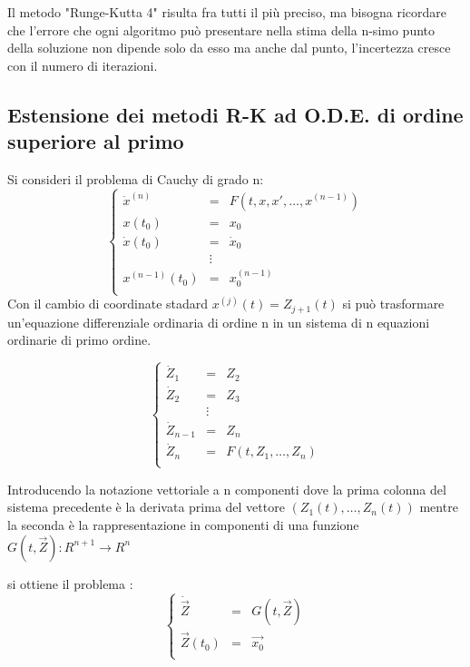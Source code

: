 \documentclass[11pt]{article}
\begin{document}
Il metodo "Runge-Kutta 4" risulta fra tutti il più preciso, ma bisogna ricordare che l'errore che ogni algoritmo può presentare nella stima della n-simo punto della soluzione non dipende solo da esso ma anche dal punto, l'incertezza cresce con il numero di iterazioni.
\clearpage

\subsection{Estensione dei metodi R-K ad O.D.E. di ordine superiore al primo}
Si consideri il problema di Cauchy di grado n:
	\begin{equation}
	\left\{ 
			\begin{array}{lcl}
 			\dot{x}^{(n)} &=& F(t , x , x', \ldots ,x^{(n-1)})\\
 			x(t_{0}) &=& x_{0} \\
			\dot{x}(t_{0}) &=& \dot{x}_{0} \\
			 & \vdots & \\
			x^{(n-1)}(t_{0}) &=& x^{(n-1)}_{0} \\
  			\end{array} \right.
	\end{equation}
Con il cambio di coordinate stadard $ x^{(j)}(t) = Z_{j+1}(t) $ si può trasformare un'equazione differenziale ordinaria di ordine n in un sistema di n equazioni ordinarie di primo ordine.

	\begin{displaymath}
	\left\{ 
			\begin{array}{lcl}
 			\dot{Z}_{1} &=& Z_{2}\\
 			\dot{Z}_{2} &=& Z_{3}\\
			 & \vdots & \\
			\dot{Z}_{n-1} &=& Z_{n}\\
			\dot{Z}_{n} &=& F(t , Z_{1} , \ldots , Z_{n})\\
			\end{array} \right.
	\end{displaymath}

Introducendo la notazione vettoriale a n componenti dove la prima colonna del sistema precedente è la derivata prima del vettore $(Z_{1}(t) ,\ldots, Z_{n}(t))$ mentre la seconda è la rappresentazione in componenti di una funzione $ G(t,\vec{Z}) : R^{n+1} \longrightarrow R^{n}$ 

si ottiene il problema : 
	\begin{equation}
	\left\{ 
			\begin{array}{lcl}
 			\dot{\vec{Z}} &=& G(t, \vec{Z})\\
 			\vec{Z}(t_{0}) &=& \vec{x_{0}} \\
  			\end{array} \right.
	\end{equation}
\end{document}
